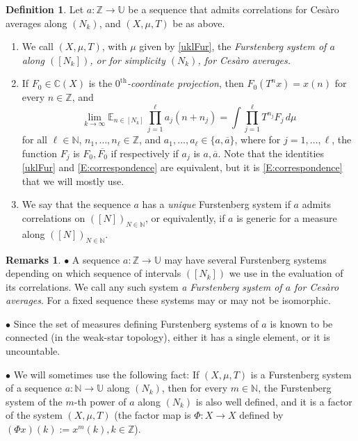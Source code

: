 \documentclass[11pt]{amsart}
\theoremstyle{definition}
\newtheorem{definition}{Definition}[section]
\newtheorem*{remarks}{Remarks}
\newcommand{\C}{{\mathbb C}}
\newcommand{\E}{{\mathbb E}}
\newcommand{\N}{{\mathbb N}}
\newcommand{\Z}{{\mathbb Z}}
\newcommand{\U}{{\mathbb U}}
\begin{document}
\begin{definition}
	\label{D:Furstenberg}
	Let  $a\colon \Z\to \U$ be a sequence that  admits
	correlations  for Ces\`aro averages along $(N_k)$,  and  $(X,\mu, T)$ be as above.
	\begin{enumerate}
		\item
		We call $(X,\mu,T)$, with $\mu$ given by \eqref{uklFur}, the {\em  Furstenberg system
			of $a$ along  $([N_k])$, or for simplicity  $(N_k)$, for Ces\`aro averages.}
		
		\smallskip
		
		\item
	If  $F_0\in \C(X)$  is the   {\em $0^{\text{th}}$-coordinate projection}, then    $F_0(T^nx)=x(n)$ for every $n\in \Z$, and
		\begin{equation}
			\label{E:correspondence}
			\lim_{k\to\infty}\E_{n\in[N_k]}\,  \prod_{j=1}^\ell a_j(n+n_j) =\int  \prod_{j=1}^\ell
			T^{n_j}F_j \, d\mu
		\end{equation}
		for all  $\ell\in \N$, $n_1,\ldots, n_\ell\in \Z$,  and
		 $a_1,\ldots, a_\ell\in \{a,\overline{a}\}$, where for $j=1,\ldots, \ell$, the function $F_j$ is $F_0,\overline{F_0}$ if respectively if $a_j$ is $a,\overline{a}$. Note that the identities \eqref{uklFur} and \eqref{E:correspondence} are equivalent, but it is \eqref{E:correspondence} that we will mostly use.
		
		 \smallskip
		
		\item
		We say that the sequence
		$a$ has a {\em unique} Furstenberg system  if  $a$ admits  correlations on $([N])_{N\in\N}$,  or equivalently, if $a$ is generic for a measure along $([N])_{N\in\N}$.
	\end{enumerate}
\end{definition}	
\begin{remarks}
$\bullet$ 	A sequence $a\colon \Z\to \U$ may have several  Furstenberg systems
	depending on which sequence of intervals $([N_k])$ we use in the evaluation of its   correlations. We call any such system {\em a  Furstenberg system of $a$ for Ces\`aro averages}.
	For a fixed sequence these systems may or may not be  isomorphic.
	
$\bullet$ Since the set of measures defining Furstenberg systems of $a$ is known to be connected (in the weak-star topology), either it has a single element, or it is uncountable.


	$\bullet$ We will sometimes use the following fact: If $(X,\mu,T)$ is a Furstenberg system of a sequence $a\colon \N\to \U$ along $(N_k)$, then for every $m\in\N$, the Furstenberg system of the $m$-th power of $a$  along $(N_k)$ is also well defined, and it is a factor of the system $(X,\mu,T)$ (the factor map is
	$\Phi\colon X\to X$ defined by $(\Phi x)(k):=x^m(k), k\in\Z$).
\end{remarks}	
\end{document}
